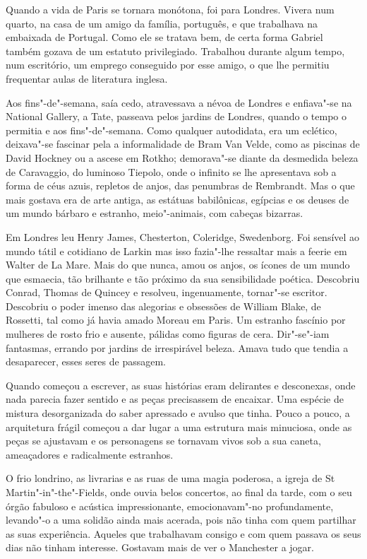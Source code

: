 Quando a vida de Paris se tornara monótona, foi para Londres. Vivera num
quarto, na casa de um amigo da família, português, e que trabalhava na
embaixada de Portugal. Como ele se tratava bem, de certa forma Gabriel
também gozava de um estatuto privilegiado. Trabalhou durante algum
tempo, num escritório, um emprego conseguido por esse amigo, o que lhe
permitiu frequentar aulas de literatura inglesa.

Aos fins"-de"-semana, saía cedo, atravessava a névoa de Londres e
enfiava"-se na National Gallery, a Tate, passeava pelos jardins de
Londres, quando o tempo o permitia e aos fins"-de"-semana. Como qualquer
autodidata, era um eclético, deixava"-se fascinar pela a informalidade
de Bram Van Velde, como as piscinas de David Hockney ou a ascese em
Rotkho; demorava"-se diante da desmedida beleza de Caravaggio, do
luminoso Tiepolo, onde o infinito se lhe apresentava sob a forma de céus
azuis, repletos de anjos, das penumbras de Rembrandt. Mas o que mais
gostava era de arte antiga, as estátuas babilônicas, egípcias e os
deuses de um mundo bárbaro e estranho, meio"-animais, com cabeças
bizarras.

Em Londres leu Henry James, Chesterton, Coleridge, Swedenborg. Foi
sensível ao mundo tátil e cotidiano de Larkin mas isso fazia"-lhe
ressaltar mais a feerie em Walter de La Mare. Mais do que nunca, amou os
anjos, os ícones de um mundo que esmaecia, tão brilhante e tão próximo
da sua sensibilidade poética. Descobriu Conrad, Thomas de Quincey e
resolveu, ingenuamente, tornar"-se escritor. Descobriu o poder imenso das
alegorias e obsessões de William Blake, de Rossetti, tal como já havia
amado Moreau em Paris. Um estranho fascínio por mulheres de rosto frio e
ausente, pálidas como figuras de cera. Dir"-se"-iam fantasmas, errando por
jardins de irrespirável beleza. Amava tudo que tendia a desaparecer,
esses seres de passagem.

Quando começou a escrever, as suas histórias eram delirantes e
desconexas, onde nada parecia fazer sentido e as peças precisassem de
encaixar. Uma espécie de mistura desorganizada do saber apressado e
avulso que tinha. Pouco a pouco, a arquitetura frágil começou a dar
lugar a uma estrutura mais minuciosa, onde as peças se ajustavam e os
personagens se tornavam vivos sob a sua caneta, ameaçadores e
radicalmente estranhos.

O frio londrino, as livrarias e as ruas de uma magia poderosa, a igreja
de St Martin"-in"-the"-Fields, onde ouvia belos concertos, ao final da
tarde, com o seu órgão fabuloso e acústica impressionante,
emocionavam"-no profundamente, levando"-o a uma solidão ainda mais
acerada, pois não tinha com quem partilhar as suas experiência. Aqueles
que trabalhavam consigo e com quem passava os seus dias não tinham
interesse. Gostavam mais de ver o Manchester a jogar.

